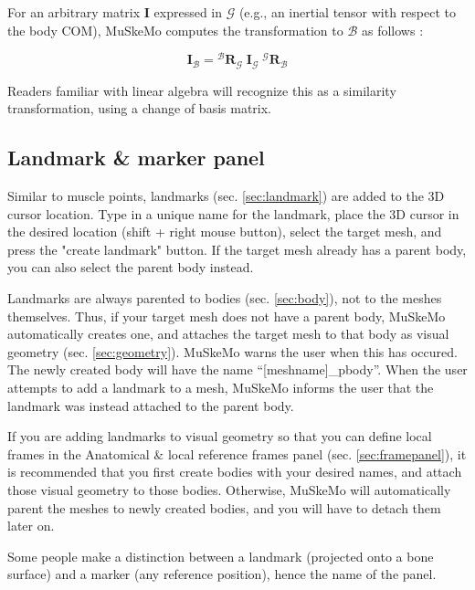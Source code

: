 \documentclass{article}
\begin{document}
For an arbitrary matrix \(\mathbf{I}\) expressed in \(\mathcal{G}\) (e.g., an inertial tensor with respect to the body COM), MuSkeMo computes the transformation to \(\mathcal{B}\) as follows \cite{valleryAdvancedDynamics2019}:

\begin{equation}
\mathbf{I}_{\mathcal{B}} = {}^{\mathcal{B}} \mathbf{R}_{\mathcal{G}} \;\mathbf{I}_{\mathcal{G}} \; {}^{\mathcal{G}} \mathbf{R}_{\mathcal{B}}
\label{eq:similaritytransformation}
\end{equation}

Readers familiar with linear algebra will recognize this as a similarity transformation, using a change of basis matrix.

\subsection{Landmark \& marker panel}
\label{sec:landmarkpanel}

Similar to muscle points, landmarks (sec. \ref{sec:landmark}) are added to the 3D cursor location. Type in a unique name for the landmark, place the 3D cursor in the desired location (shift + right mouse button), select the target mesh, and press the "create landmark" button. If the target mesh already has a parent body, you can also select the parent body instead. 

Landmarks are always parented to bodies (sec. \ref{sec:body}), not to the meshes themselves. Thus, if your target mesh does not have a parent body, MuSkeMo automatically creates one, and attaches the target mesh to that body as visual geometry (sec. \ref{sec:geometry}). MuSkeMo warns the user when this has occured. The newly created body will have the name ``[meshname]\_pbody''. When the user attempts to add a landmark to a mesh, MuSkeMo informs the user that the landmark was instead attached to the parent body.

If you are adding landmarks to visual geometry so that you can define local frames in the Anatomical \& local reference frames panel (sec. \ref{sec:framepanel}), it is recommended that you first create bodies with your desired names, and attach those visual geometry to those bodies. Otherwise, MuSkeMo will automatically parent the meshes to newly created bodies, and you will have to detach them later on.

Some people make a distinction between a landmark (projected onto a bone surface) and a marker (any reference position), hence the name of the panel.
\end{document}
